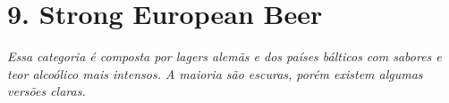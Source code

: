\section*{9. Strong European Beer}
\textit{Essa categoria é composta por lagers alemãs e dos países bálticos com sabores e teor alcoólico mais intensos. A maioria são escuras, porém existem algumas versões claras.}
